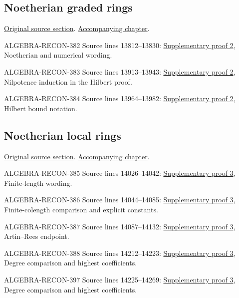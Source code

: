 \subsection{Noetherian graded rings}
\hypertarget{algebra-source-section-noetherian-graded}{}
\noindent\href{https://github.com/stacks/stacks-project/blob/a04446e57ec1fbc252a871afcec7752fb2807b14/algebra.tex\#L13774}{Original source section}. \href{algebra.pdf\#nameddest=section-noetherian-graded}{Accompanying chapter}.

\begin{AlgebraSourceRoutes}
\item[ALGEBRA-RECON-382] Source lines 13812--13830: \hyperlink{algebra_graded_proj_hilbert_notes_20260927}{Supplementary proof 2}, Noetherian and numerical wording.
\item[ALGEBRA-RECON-383] Source lines 13913--13943: \hyperlink{algebra_graded_proj_hilbert_notes_20260927}{Supplementary proof 2}, Nilpotence induction in the Hilbert proof.
\item[ALGEBRA-RECON-384] Source lines 13964--13982: \hyperlink{algebra_graded_proj_hilbert_notes_20260927}{Supplementary proof 2}, Hilbert bound notation.
\end{AlgebraSourceRoutes}

\subsection{Noetherian local rings}
\hypertarget{algebra-source-section-Noetherian-local}{}
\noindent\href{https://github.com/stacks/stacks-project/blob/a04446e57ec1fbc252a871afcec7752fb2807b14/algebra.tex\#L13991}{Original source section}. \href{algebra.pdf\#nameddest=section-Noetherian-local}{Accompanying chapter}.

\begin{AlgebraSourceRoutes}
\item[ALGEBRA-RECON-385] Source lines 14026--14042: \hyperlink{algebra_local_hilbert_dimension_notes_20260927}{Supplementary proof 3}, Finite-length wording.
\item[ALGEBRA-RECON-386] Source lines 14044--14085: \hyperlink{algebra_local_hilbert_dimension_notes_20260927}{Supplementary proof 3}, Finite-colength comparison and explicit constants.
\item[ALGEBRA-RECON-387] Source lines 14087--14132: \hyperlink{algebra_local_hilbert_dimension_notes_20260927}{Supplementary proof 3}, Artin–Rees endpoint.
\item[ALGEBRA-RECON-388] Source lines 14212--14223: \hyperlink{algebra_local_hilbert_dimension_notes_20260927}{Supplementary proof 3}, Degree comparison and highest coefficients.
\item[ALGEBRA-RECON-397] Source lines 14225--14269: \hyperlink{algebra_local_hilbert_dimension_notes_20260927}{Supplementary proof 3}, Degree comparison and highest coefficients.
\end{AlgebraSourceRoutes}

